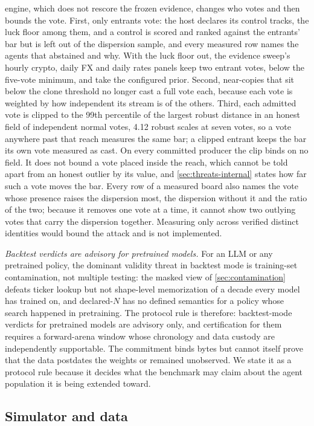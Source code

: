 engine, which does not rescore the frozen evidence, changes who votes and then bounds the vote. First, only entrants vote: the host declares its control tracks, the luck floor among them, and a control is scored and ranked against the entrants' bar but is left out of the dispersion sample, and every measured row names the agents that abstained and why. With the luck floor out, the evidence sweep's hourly crypto, daily FX and daily rates panels keep two entrant votes, below the five-vote minimum, and take the configured prior. Second, near-copies that sit below the clone threshold no longer cast a full vote each, because each vote is weighted by how independent its stream is of the others. Third, each admitted vote is clipped to the 99th percentile of the largest robust distance in an honest field of independent normal votes, 4.12 robust scales at seven votes, so a vote anywhere past that reach measures the same bar; a clipped entrant keeps the bar its own vote measured as cast. On every committed producer the clip binds on no field. It does not bound a vote placed inside the reach, which cannot be told apart from an honest outlier by its value, and \cref{sec:threats-internal} states how far such a vote moves the bar. Every row of a measured board also names the vote whose presence raises the dispersion most, the dispersion without it and the ratio of the two; because it removes one vote at a time, it cannot show two outlying votes that carry the dispersion together. Measuring only across verified distinct identities would bound the attack and is not implemented.

\emph{Backtest verdicts are advisory for pretrained models.} For an LLM or any pretrained policy, the dominant validity threat in backtest mode is training-set contamination, not multiple testing: the masked view of \cref{sec:contamination} defeats ticker lookup but not shape-level memorization of a decade every model has trained on, and declared-$N$ has no defined semantics for a policy whose search happened in pretraining. The protocol rule is therefore: backtest-mode verdicts for pretrained models are advisory only, and certification for them requires a forward-arena window whose chronology and data custody are independently supportable. The commitment binds bytes but cannot itself prove that the data postdates the weights or remained unobserved. We state it as a protocol rule because it decides what the benchmark may claim about the agent population it is being extended toward.

\subsection{Simulator and data}\label{sec:simdata}

